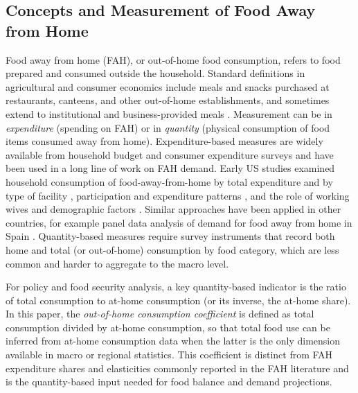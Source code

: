 
\subsection{Concepts and Measurement of Food Away from Home}

Food away from home (FAH), or out-of-home food consumption, refers to food prepared and consumed outside the household. Standard definitions in agricultural and consumer economics include meals and snacks purchased at restaurants, canteens, and other out-of-home establishments, and sometimes extend to institutional and business-provided meals \citep{USDA_ERS_FAH}. Measurement can be in \emph{expenditure} (spending on FAH) or in \emph{quantity} (physical consumption of food items consumed away from home). Expenditure-based measures are widely available from household budget and consumer expenditure surveys and have been used in a long line of work on FAH demand. Early US studies examined household consumption of food-away-from-home by total expenditure and by type of facility \citep{McCracken1987}, participation and expenditure patterns \citep{Byrne1996}, and the role of working wives and demographic factors \citep{Kinsey1983, Yen1993}. Similar approaches have been applied in other countries, for example panel data analysis of demand for food away from home in Spain \citep{Angulo2007}. Quantity-based measures require survey instruments that record both home and total (or out-of-home) consumption by food category, which are less common and harder to aggregate to the macro level.

For policy and food security analysis, a key quantity-based indicator is the ratio of total consumption to at-home consumption (or its inverse, the at-home share). In this paper, the \emph{out-of-home consumption coefficient} is defined as total consumption divided by at-home consumption, so that total food use can be inferred from at-home consumption data when the latter is the only dimension available in macro or regional statistics. This coefficient is distinct from FAH expenditure shares and elasticities commonly reported in the FAH literature and is the quantity-based input needed for food balance and demand projections.


